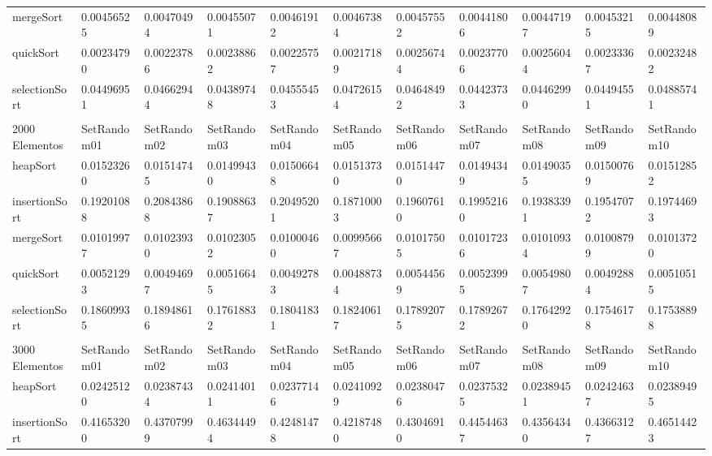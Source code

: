 \documentclass[article,a4paper]{article}
\begin{document}
\begin{table}[h]
{\begin{tabular}{lllllllllll}
mergeSort       & 0.00456525  & 0.00470494  & 0.00455071  & 0.00461912  & 0.00467384  & 0.00457552  & 0.00441806  & 0.00447197  & 0.00453215  & 0.00448089  \\
quickSort       & 0.00234790  & 0.00223786  & 0.00238862  & 0.00225757  & 0.00217189  & 0.00256744  & 0.00237706  & 0.00256044  & 0.00233367  & 0.00232482  \\
selectionSort   & 0.04496951  & 0.04662944  & 0.04389748  & 0.04555453  & 0.04726154  & 0.04648492  & 0.04423733  & 0.04462990  & 0.04494551  & 0.04885741  \\
                &             &             &             &             &             &             &             &             &             &             \\
2000 Elementos  & SetRandom01 & SetRandom02 & SetRandom03 & SetRandom04 & SetRandom05 & SetRandom06 & SetRandom07 & SetRandom08 & SetRandom09 & SetRandom10 \\
heapSort        & 0.01523260  & 0.01514745  & 0.01499430  & 0.01506648  & 0.01513730  & 0.01514470  & 0.01494349  & 0.01490355  & 0.01500769  & 0.01512852  \\
insertionSort   & 0.19201088  & 0.20843868  & 0.19088637  & 0.20495201  & 0.18710003  & 0.19607610  & 0.19952160  & 0.19383391  & 0.19547072  & 0.19744693  \\
mergeSort       & 0.01019977  & 0.01023930  & 0.01023052  & 0.01000460  & 0.00995667  & 0.01017505  & 0.01017236  & 0.01010934  & 0.01008799  & 0.01013720  \\
quickSort       & 0.00521293  & 0.00494697  & 0.00516645  & 0.00492783  & 0.00488734  & 0.00544569  & 0.00523995  & 0.00549807  & 0.00492884  & 0.00510515  \\
selectionSort   & 0.18609935  & 0.18948616  & 0.17618832  & 0.18041831  & 0.18240617  & 0.17892075  & 0.17892672  & 0.17642920  & 0.17546178  & 0.17538898  \\
                &             &             &             &             &             &             &             &             &             &             \\
3000 Elementos  & SetRandom01 & SetRandom02 & SetRandom03 & SetRandom04 & SetRandom05 & SetRandom06 & SetRandom07 & SetRandom08 & SetRandom09 & SetRandom10 \\
heapSort        & 0.02425120  & 0.02387434  & 0.02414011  & 0.02377146  & 0.02410929  & 0.02380476  & 0.02375325  & 0.02389451  & 0.02424637  & 0.02389495  \\
insertionSort   & 0.41653200  & 0.43707999  & 0.46344494  & 0.42481478  & 0.42187480  & 0.43046910  & 0.44544637  & 0.43564340  & 0.43663127  & 0.46514423  \\

\end{tabular}}
\end{table}
\end{document}
